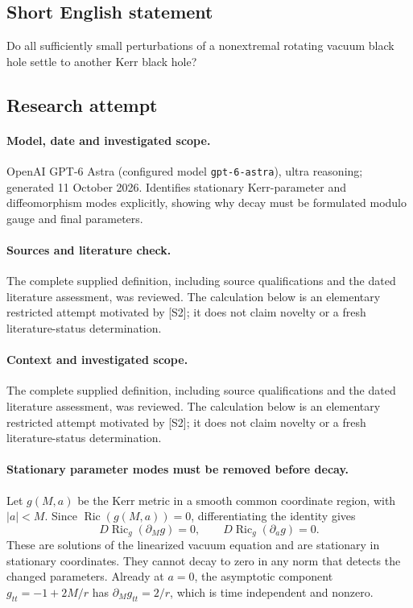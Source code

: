 \documentclass[11pt]{article}
\begin{document}
\subsection{Short English statement}
Do all sufficiently small perturbations of a nonextremal rotating vacuum black hole settle to another Kerr black hole?
\subsection{Research attempt}
\paragraph{Model, date and investigated scope.}
OpenAI GPT-6 Astra (configured model \texttt{gpt-6-astra}), ultra reasoning; generated 11 October 2026. Identifies stationary Kerr-parameter and diffeomorphism modes explicitly, showing why decay must be formulated modulo gauge and final parameters.

\paragraph{Sources and literature check.}
The complete supplied definition, including source qualifications and the dated literature assessment, was reviewed. The calculation below is an elementary restricted attempt motivated by [S2]; it does not claim novelty or a fresh literature-status determination.

\paragraph{Context and investigated scope.} The complete supplied definition, including source qualifications and the dated literature assessment, was reviewed. The calculation below is an elementary restricted attempt motivated by [S2]; it does not claim novelty or a fresh literature-status determination.

\paragraph{Stationary parameter modes must be removed before decay.} Let $g(M,a)$ be the Kerr metric in a smooth common coordinate region, with $|a|<M$. Since $\operatorname{Ric}(g(M,a))=0$, differentiating the identity gives
\[
 D\operatorname{Ric}_{g}(\partial_Mg)=0,\qquad
 D\operatorname{Ric}_{g}(\partial_ag)=0.
\]
These are solutions of the linearized vacuum equation and are stationary in stationary coordinates. They cannot decay to zero in any norm that detects the changed parameters. Already at $a=0$, the asymptotic component $g_{tt}=-1+2M/r$ has $\partial_Mg_{tt}=2/r$, which is time independent and nonzero.
\end{document}
